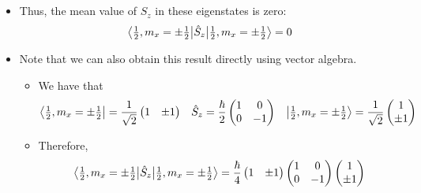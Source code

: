\documentclass[../notes.tex]{subfiles}
\begin{document}
\begin{itemize}
\begin{itemize}
        \item Thus, the mean value of $\hat{S}_z$ in these eigenstates is zero:
        \begin{equation*}
            \ev{\hat{S}_z}{\tfrac{1}{2},m_x=\pm\tfrac{1}{2}} = 0
        \end{equation*}
        \item Note that we can also obtain this result directly using vector algebra.
        \begin{itemize}
            \item We have that
            \begin{align*}
                \bra{\tfrac{1}{2},m_x=\pm\tfrac{1}{2}} &= \frac{1}{\sqrt{2}}
                \begin{pmatrix}
                    1 & \pm 1\\
                \end{pmatrix}&
                \hat{S}_z &= \frac{\hbar}{2}
                \begin{pmatrix}
                    1 & 0\\
                    0 & -1\\
                \end{pmatrix}&
                \ket{\tfrac{1}{2},m_x=\pm\tfrac{1}{2}} &= \frac{1}{\sqrt{2}}
                \begin{pmatrix}
                    1\\
                    \pm 1\\
                \end{pmatrix}
            \end{align*}
            \item Therefore,
            \begin{align*}
                \ev{\hat{S}_z}{\tfrac{1}{2},m_x=\pm\tfrac{1}{2}} &= \frac{\hbar}{4}
                \begin{pmatrix}
                    1 & \pm 1\\
                \end{pmatrix}
                \begin{pmatrix}
                    1 & 0\\
                    0 & -1\\
                \end{pmatrix}
                \begin{pmatrix}
                    1\\
                    \pm 1\\
                \end{pmatrix}\\

\end{align*}
\end{itemize}
\end{itemize}
\end{itemize}
\end{document}
